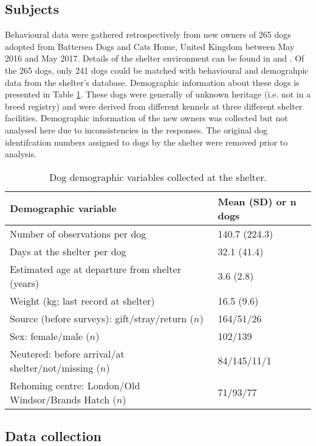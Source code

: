 \documentclass[12pt]{article}
\begin{document}
\subsection{Subjects}
Behavioural data were gathered retrospectively from new owners of 265 dogs adopted from Battersea Dogs and Cats Home, United Kingdom between May 2016 and May 2017. Details of the shelter environment can be found in \textcite{goold2017aggressiveness} and \textcite{goold2017modelling}. Of the 265 dogs, only 241 dogs could be matched with behavioural and demograhpic data from the shelter's database. Demographic information about these dogs is presented in Table \ref{table_demoshelter}. These dogs were generally of unknown heritage (i.e. not in a breed registry) and were derived from different kennels at three different shelter facilities. Demographic information of the new owners was collected but not analysed here due to inconsistencies in the responses. The original dog identifcation numbers assigned to dogs by the shelter were removed prior to analysis.

\begin{table}
  \centering
  \begin{tabular}{ll}
  \textbf{Demographic variable} & \textbf{Mean (SD) or $\boldsymbol{n}$ dogs}\\ \hline
  Number of observations per dog & 140.7 (224.3) \\
  Days at the shelter per dog & 32.1 (41.4)\\
  Estimated age at departure from shelter (years) & 3.6 (2.8)\\
  Weight (kg; last record at shelter) & 16.5 (9.6)\\
  Source (before surveys): gift/stray/return ($n$) & 164/51/26\\
  Sex: female/male ($n$) & 102/139\\
  Neutered: before arrival/at shelter/not/missing ($n$) & 84/145/11/1\\
  Rehoming centre: London/Old Windsor/Brands Hatch ($n$) & 71/93/77\\
  \hline
  \end{tabular}
  \caption{Dog demographic variables collected at the shelter.}
  \label{table_demoshelter}
\end{table}

\subsection{Data collection}
\end{document}
